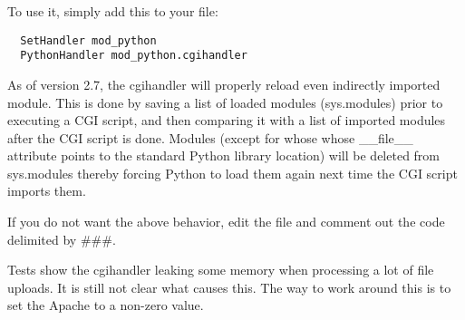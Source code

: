 To use it, simply add this to your  file: 

\begin{verbatim}
  SetHandler mod_python
  PythonHandler mod_python.cgihandler
\end{verbatim}

As of version 2.7, the cgihandler will properly reload even indirectly
imported module. This is done by saving a list of loaded modules
(sys.modules) prior to executing a CGI script, and then comparing it
with a list of imported modules after the CGI script is done.  Modules
(except for whose whose __file__ attribute points to the standard
Python library location) will be deleted from sys.modules thereby
forcing Python to load them again next time the CGI script imports
them.

If you do not want the above behavior, edit the 
file and comment out the code delimited by \#\#\#.

Tests show the cgihandler leaking some memory when processing a lot of
file uploads. It is still not clear what causes this. The way to work
around this is to set the Apache  to a non-zero
value.


